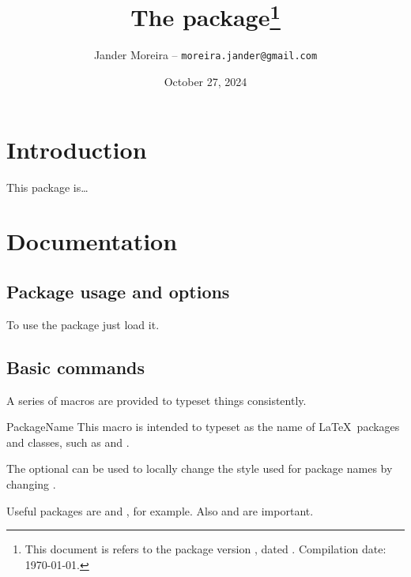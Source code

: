 \documentclass[11pt, outputdir = ./out]{article}
\title{The \PackageName{docs} package\footnote{This document is refers to the package version \DocsVersion, dated \DocsDate. Compilation date: \today.}}
\author{Jander Moreira -- \texttt{moreira.jander@gmail.com}}
\date{October 27, 2024}
\begin{document}
\maketitle

\tableofcontents


\DocsPrintChanges

\section{Introduction}

%
This package is\ldots


\section {Documentation}

\subsection{Package usage and options}
To use the  package just load it.

\begin{latexcode}
    \usepackage{docs}
\end{latexcode}


\subsection{Basic commands}

A series of macros are provided to typeset things consistently.

\begin{Macrodef}{PackageName}{}{}
    This macro is intended to typeset  as the name of \LaTeX\ packages and classes, such as  and .

    The optional  can be used to locally change the style used for package names by changing .
\end{Macrodef}

\begin{example}{}
    Useful packages are  and , for example. Also  and  are important.
\end{example}
\end{document}
